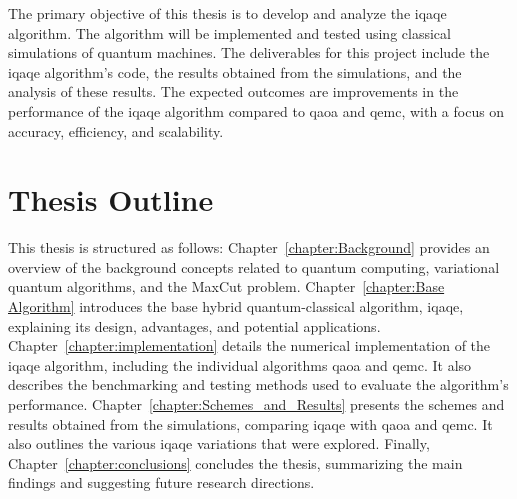 The primary objective of this thesis is to develop and analyze the \acrshort{iqaqe} algorithm. The algorithm will be implemented and tested using classical simulations of quantum machines. The deliverables for this project include the \acrshort{iqaqe} algorithm's code, the results obtained from the simulations, and the analysis of these results. The expected outcomes are improvements in the performance of the \acrshort{iqaqe} algorithm compared to \acrshort{qaoa} and \acrshort{qemc}, with a focus on accuracy, efficiency, and scalability.

\section{Thesis Outline}
\label{section:outline}




This thesis is structured as follows: Chapter~\ref{chapter:Background} provides an overview of the background concepts related to quantum computing, variational quantum algorithms, and the MaxCut problem. Chapter~\ref{chapter:Base Algorithm} introduces the base hybrid quantum-classical algorithm, \acrshort{iqaqe}, explaining its design, advantages, and potential applications. Chapter~\ref{chapter:implementation} details the numerical implementation of the \acrshort{iqaqe} algorithm, including the individual algorithms \acrshort{qaoa} and \acrshort{qemc}. It also describes the benchmarking and testing methods used to evaluate the algorithm's performance. Chapter~\ref{chapter:Schemes_and_Results} presents the schemes and results obtained from the simulations, comparing \acrshort{iqaqe} with \acrshort{qaoa} and \acrshort{qemc}. It also outlines the various \acrshort{iqaqe} variations that were explored. Finally, Chapter~\ref{chapter:conclusions} concludes the thesis, summarizing the main findings and suggesting future research directions.
